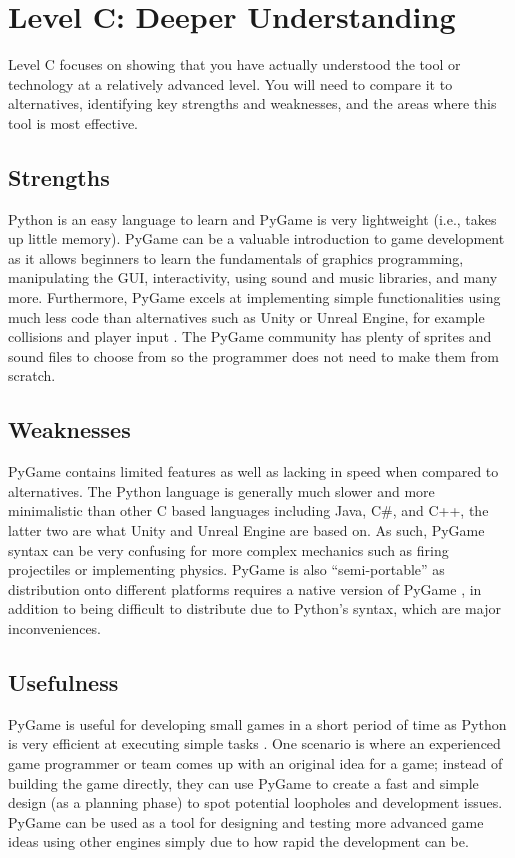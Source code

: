 \documentclass[a4paper, 11pt]{report}
\begin{document}
\newpage
\section{Level C: Deeper Understanding}

Level C focuses on showing that you have actually understood the tool or technology at a relatively advanced level. You will need to compare it to alternatives, identifying key strengths and weaknesses, and the areas where this tool is most effective. 

\subsection{Strengths}
Python is an easy language to learn and PyGame is very lightweight (i.e., takes up little memory). PyGame can be a valuable introduction to game development as it allows beginners to learn the fundamentals of graphics programming, manipulating the GUI, interactivity, using sound and music libraries, and many more. Furthermore, PyGame excels at implementing simple functionalities using much less code than alternatives such as Unity or Unreal Engine, for example collisions and player input \cite{pygame_pros}. The PyGame community has plenty of sprites and sound files to choose from so the programmer does not need to make them from scratch.

\subsection{Weaknesses}
PyGame contains limited features as well as lacking in speed when compared to alternatives. The Python language is generally much slower and more minimalistic than other C based languages including Java, C\#, and C++, the latter two are what Unity and Unreal Engine are based on. As such, PyGame syntax can be very confusing for more complex mechanics such as firing projectiles or implementing physics. PyGame is also “semi-portable” as distribution onto different platforms requires a native version of PyGame \cite{pygame_cons}, in addition to being difficult to distribute due to Python’s syntax, which are major inconveniences.  

\subsection{Usefulness}
PyGame is useful for developing small games in a short period of time as Python is very efficient at executing simple tasks \cite{pygame_uses}. One scenario is where an experienced game programmer or team comes up with an original idea for a game; instead of building the game directly, they can use PyGame to create a fast and simple design (as a planning phase) to spot potential loopholes and development issues. PyGame can be used as a tool for designing and testing more advanced game ideas using other engines simply due to how rapid the development can be.
\end{document}
